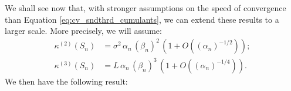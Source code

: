 \documentclass[12pt,a4paper,reqno]{amsart}
\theoremstyle{remark}
\newcommand{\R}{\mathbb{R}}
\newcommand{\proba}{\mathbb{P}}
\newcommand{\alphan}{\alpha_n}
\newcommand{\betan}{\beta_n}
\begin{document}
We shall see now that, with stronger assumptions on the speed of convergence than Equation \eqref{eq:cv_sndthrd_cumulants},
we can extend these results to a larger scale.
More precisely, we will assume:
\begin{align}\kappa^{(2)}(S_{n})&= \sigma^{2}\,\alphan\,(\betan)^{2}\,(1+O((\alphan)^{-1/2})); \nonumber\\ 
\kappa^{(3)}(S_{n}) &= L \,\alphan\,(\betan)^{3}\,(1+O((\alphan)^{-1/4})).\label{eq:limitcumulant}
\end{align}
We then have the following result:
\end{document}
